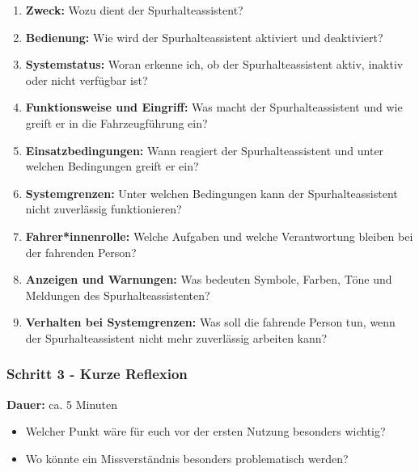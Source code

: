 \begin{enumerate}
    \item \textbf{Zweck:}
    Wozu dient der Spurhalteassistent?

    \item \textbf{Bedienung:}
    Wie wird der Spurhalteassistent aktiviert und deaktiviert?

    \item \textbf{Systemstatus:}
    Woran erkenne ich, ob der Spurhalteassistent aktiv, inaktiv oder
    nicht verfügbar ist?

    \item \textbf{Funktionsweise und Eingriff:}
    Was macht der Spurhalteassistent und wie greift er in die
    Fahrzeugführung ein?

    \item \textbf{Einsatzbedingungen:}
    Wann reagiert der Spurhalteassistent und unter welchen Bedingungen
    greift er ein?

    \item \textbf{Systemgrenzen:}
    Unter welchen Bedingungen kann der Spurhalteassistent nicht
    zuverlässig funktionieren?

    \item \textbf{Fahrer*innenrolle:}
    Welche Aufgaben und welche Verantwortung bleiben bei der fahrenden
    Person?

    \item \textbf{Anzeigen und Warnungen:}
    Was bedeuten Symbole, Farben, Töne und Meldungen des
    Spurhalteassistenten?

    \item \textbf{Verhalten bei Systemgrenzen:}
    Was soll die fahrende Person tun, wenn der Spurhalteassistent nicht
    mehr zuverlässig arbeiten kann?
\end{enumerate}

\subsubsection*{Schritt 3 - Kurze Reflexion}

\noindent
\textbf{Dauer:} ca. 5 Minuten

\begin{itemize}
    \item Welcher Punkt wäre für euch vor der ersten Nutzung besonders
    wichtig?
    \item Wo könnte ein Missverständnis besonders problematisch werden?
\end{itemize}

